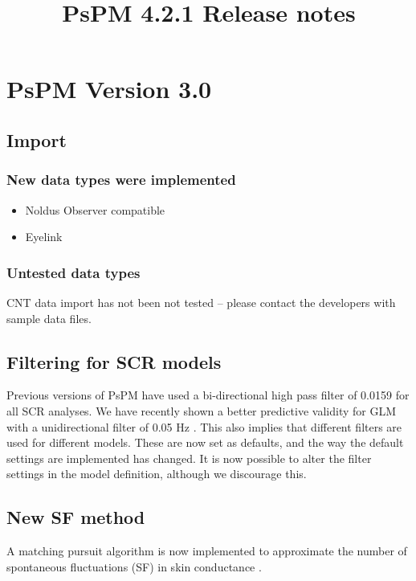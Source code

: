 \documentclass[english]{article}
\title{PsPM 4.2.1 Release notes}
\numberwithin{equation}{section}
\numberwithin{figure}{section}
\begin{document}
\maketitle
\date
\pagebreak

\section{PsPM Version 3.0}

\subsection*{Import}

\subsubsection*{New data types were implemented}
\begin{itemize}
\item Noldus Observer compatible 
\item Eyelink
\end{itemize}

\subsubsection*{Untested data types}

CNT data import has not been not tested -- please contact the developers
with sample data files. 

\subsection*{Filtering for SCR models}

Previous versions of PsPM have used a bi-directional high pass filter
of 0.0159 for all SCR analyses. We have recently shown a better predictive
validity for GLM with a unidirectional filter of 0.05 Hz \cite{Bach:2013aa}.
This also implies that different filters are used for different models.
These are now set as defaults, and the way the default settings are
implemented has changed. It is now possible to alter the filter settings
in the model definition, although we discourage this.

\subsection*{New SF method}

A matching pursuit algorithm is now implemented to approximate the
number of spontaneous fluctuations (SF) in skin conductance \cite{Bach:2015aa}.
\end{document}
